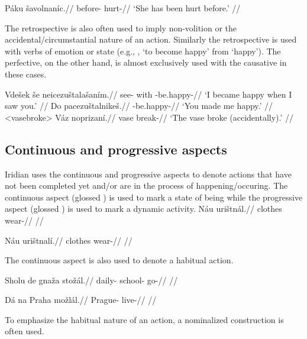\begingl
\gla Páku \v{s}avolnan\'ic.//
\glb before- hurt-//
\glft `She has been hurt before.' //
\endgl
\xe

\par The retrospective is also often used to imply non-volition or the  accidental/circumstantial nature of an action. Similarly the retrospective is used with verbs of emotion or state (e.g., , ‘to become happy’ from  ‘happy’). The perfective, on the other hand, is almost exclusively used with the causative in these cases.

\pex
\a	\begingl
\gla Vde\v{s}ek \v{s}e neicezu\v{s}tala\v{s}an\'im.//
\glb see- with -be.happy-//
\glft `I became happy when I saw you.' //
\endgl
\a	\begingl
\gla Do pacezu\v{s}talnike\v{s}.//
\glb {} -be.happy-//
\glft `You made me happy.' //
\endgl
\xe
\pex<vasebroke>
\begingl
\gla Váz noprizan\'i.//
\glb vase break-//
\glft `The vase broke (accidentally).' //
\endgl
\xe

\subsection{Continuous and progressive aspects}
Iridian uses the continuous and progressive aspects to denote actions that have not been completed yet and/or are in the process of happening/occuring. The continuous aspect (glossed ) is used to mark a state of being while the progressive aspect (glossed ) is used to mark a dynamic activity.
\pex
\begingl
\gla N\'au uri\v{s}tn\'al.//
\glb clothes wear-//
\glft {} //
\endgl
\xe

\pex
\begingl
\gla N\'au uri\v{s}tnal\'i.//
\glb clothes wear-//
\glft {} //
\endgl
\xe

The continuous aspect is also used to denote a habitual action.

\pex
\begingl
\gla Sholu de gna\v{z}a sto\v{z}\'al.//
\glb daily-  school- go-//
\glft {} //
\endgl
\xe

\pex
\begingl
\gla D\'a na Praha mo\v{z}l\'al.//
\glb {}  Prague- live-//
\glft {} //
\endgl
\xe

To emphasize the habitual nature of an action, a nominalized construction is often used.

